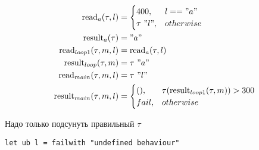 \documentclass{article}
\renewcommand{\read}[1]{\text{read}_{#1}}
\newcommand{\result}[1]{\text{result}_{#1}}
\begin{document}
\begin{align}
\read{a}(\tau,l) &= \begin{cases} 400,& l=="a" \\ \tau\ "l", & otherwise\end{cases}\\
\result{a}(\tau) &= "a" \nonumber \\
\read{loop1}(\tau,m,l) &= \read{a}(\tau,l)\\
\result{loop}(\tau,m) &= \tau\  "a" \nonumber \\
\read{main}(\tau,m,l) &= \tau\ "l"\\
\result{main}(\tau,m,l) &= \begin{cases} (),& \tau(\result{loop1}(\tau,m))>300  \\ fail, & otherwise\end{cases}
\end{align}

Надо только подсунуть правильный $\tau$
\begin{verbatim}
let ub l = failwith "undefined behaviour"
\end{verbatim}
\end{document}
